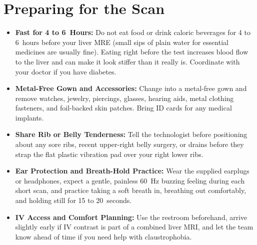 \section{Preparing for the Scan}
\begin{itemize}
\item \textbf{Fast for 4 to 6~Hours:} Do not eat food or drink caloric beverages for 4 to 6~hours before your liver MRE (small sips of plain water for essential medicines are usually fine). Eating right before the test increases blood flow to the liver and can make it look stiffer than it really is. Coordinate with your doctor if you have diabetes.
\item \textbf{Metal-Free Gown and Accessories:} Change into a metal-free gown and remove watches, jewelry, piercings, glasses, hearing aids, metal clothing fasteners, and foil-backed skin patches. Bring ID cards for any medical implants.
\item \textbf{Share Rib or Belly Tenderness:} Tell the technologist before positioning about any sore ribs, recent upper-right belly surgery, or drains before they strap the flat plastic vibration pad over your right lower ribs.
\item \textbf{Ear Protection and Breath-Hold Practice:} Wear the supplied earplugs or headphones, expect a gentle, painless 60~Hz buzzing feeling during each short scan, and practice taking a soft breath in, breathing out comfortably, and holding still for 15 to 20~seconds.
\item \textbf{IV Access and Comfort Planning:} Use the restroom beforehand, arrive slightly early if IV contrast is part of a combined liver MRI, and let the team know ahead of time if you need help with claustrophobia.
\end{itemize}

